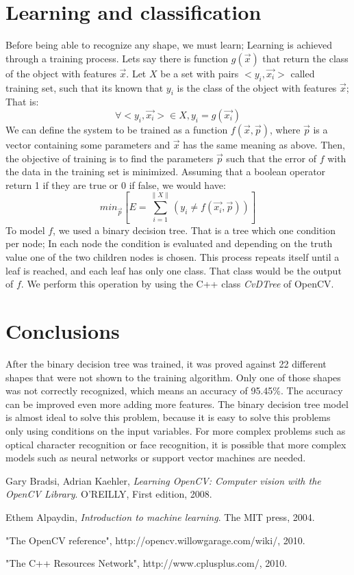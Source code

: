 \documentclass{article}
\begin{document}
	\section{Learning and classification}
	Before being able to recognize any shape, we must learn; Learning is achieved
	through a training process.  Lets say there is function $g(\vec{x})$ that 
	return the class of the object with features $\vec{x}$. 
	Let $X$ be a set with pairs $<y_i,\vec{x_i}>$ called training set, such that
	its known that $y_i$ is the class of the object with features $\vec{x}$; That is:
	\[ \forall <y_i,\vec{x_i}> \in X , y_i=g(\vec{x_i}) \]
	We can define the system to be trained as a function $f(\vec{x},\vec{p})$,
	where $\vec{p}$ is a vector containing some parameters and $\vec{x}$ has
	the same meaning as above. Then, the objective of training is to find the
	parameters $\vec{p}$ such that the error of $f$ with the data in the training
	set is minimized. Assuming that a boolean operator return 1 if they are true
	or 0 if false, we would have:
	\[ min_{\vec{p}} \left[ E = \sum_{i=1}^{\| X \|}  
		( y_i \not= f(\vec{x_i},\vec{p}) ) \right] \]
	To model $f$, we used a binary decision tree. That is a tree which one
	condition per node; In each node the condition is evaluated and depending
	on the truth value one of the two children nodes is chosen. This process
	repeats itself until a leaf is reached, and each leaf has only one class.
	That class would be the output of $f$. We perform this operation by using the
	C++ class \textit{CvDTree} of OpenCV. 
	
	\section{Conclusions}
	After the binary decision tree was trained, it was proved against 22 different
	shapes that were not shown to the training algorithm. Only one of those shapes
	was not correctly recognized, which means an accuracy of 95.45\%. The accuracy can
	be improved even more adding more features.
	The binary decision tree model is almost ideal to solve this problem, because it
	is easy to solve this problems only using conditions on the input variables. For
	more complex problems such as optical character recognition or face recognition,
	it is possible that more complex models such as neural networks or support vector
	machines are needed.
	
	\begin{thebibliography}{9}
	
			Gary Bradsi, Adrian Kaehler,
			\emph{Learning OpenCV: Computer vision with the OpenCV Library}.
			O'REILLY,
			First edition,
			2008.
			
			Ethem Alpaydin,
			\emph{Introduction to machine learning}.
			The MIT press,
			2004.
		
			"The OpenCV reference",
			http://opencv.willowgarage.com/wiki/,
			2010.
			
			"The C++ Resources Network",
			http://www.cplusplus.com/,
			2010.
			
	\end{thebibliography}
	
\end{document}
